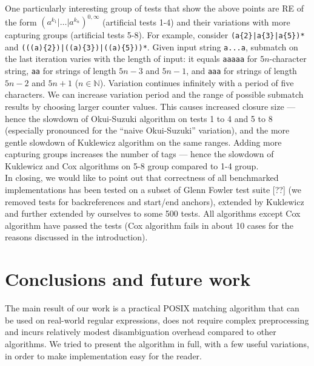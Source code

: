 \documentclass[AMA,STIX1COL]{WileyNJD-v2}
\newcommand{\YN}{\mathbb{N}}
\begin{document}
One particularly interesting group of tests that show the above points
are RE of the form $(a^{k_1}|\hdots|a^{k_n})^{0,\infty}$
(artificial tests 1-4)
and their variations with more capturing groups
(artificial tests 5-8).
For example, consider \texttt{(a\{2\}|a\{3\}|a\{5\})*} and \texttt{(((a)\{2\})|((a)\{3\})|((a)\{5\}))*}.
Given input string \texttt{a...a},
submatch on the last iteration varies with the length of input:
it equals \texttt{aaaaa} for $5n$-character string,
\texttt{aa} for strings of length $5n - 3$ and $5n - 1$,
and \texttt{aaa} for strings of length $5n - 2$ and $5n + 1$ ($n \in \YN$).
Variation continues infinitely with a period of five characters.
%
We can increase variation period and the range of possible submatch results by choosing larger counter values.
%
This causes increased closure size ---
hence the slowdown of Okui-Suzuki algorithm on tests 1 to 4 and 5 to 8 (especially pronounced for the ``naive Okui-Suzuki'' variation),
and the more gentle slowdown of Kuklewicz algorithm on the same ranges.
%
Adding more capturing groups increases the number of tags ---
hence the slowdown of Kuklewicz and Cox algorithms on 5-8 group compared to 1-4 group.
%
\\

In closing, we would like to point out that correctness
of all benchmarked implementations has been tested on a subset of Glenn Fowler test suite [??]
(we removed tests for backreferences and start/end anchors),
extended by Kuklewicz and further extended by ourselves to some 500 tests.
All algorithms except Cox algorithm have passed the tests
(Cox algorithm fails in about 10 cases for the reasons discussed in the introduction).

\FloatBarrier


\section{Conclusions and future work}

The main result of our work is a practical POSIX matching algorithm
that can be used on real-world regular expressions,
does not require complex preprocessing
and incurs relatively modest disambiguation overhead compared to other algorithms.
%
We tried to present the algorithm in full, with a few useful variations,
in order to make implementation easy for the reader.
\\
\end{document}
